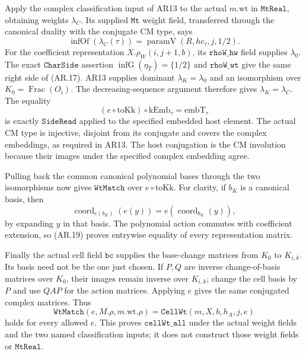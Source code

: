 Apply the complex classification input of AR13 to the actual
$m.\mathrm{wt}$ in $\texttt{MtReal}$, obtaining weights
$\lambda_C$. Its supplied $\texttt{Mt}$ weight field, transferred
through the canonical duality with the conjugate CM type, says
\[
 \operatorname{infOf}(\lambda_C(\tau))
           =\operatorname{paramV}(R,hc_\tau,j,1/2).
                                                               \tag{AR.17}
\]
For the coefficient representation $X.\rho_W(i,j+1,b)$, its
$\texttt{rhoW\_hw}$ field supplies $\lambda_0$.
The exact $\texttt{CharSide}$ assertion
$\operatorname{infG}(\eta_T)=\{1/2\}$ and
$\texttt{rhoW\_wt}$ give the same right side of (AR.17).
AR13 supplies dominant $\lambda_K=\lambda_0$ and an isomorphism
over $K_0=\operatorname{Frac}(O_i)$. The decreasing-sequence argument
therefore gives $\lambda_K=\lambda_C$.
The equality
\[
 (e\circ\mathrm{toKk})\circ\mathrm{kEmb}_\tau
                      =\mathrm{embT}_\tau
                                                               \tag{AR.18}
\]
is exactly $\texttt{SideRead}$ applied to the specified embedded
host element. The actual CM type is injective, disjoint from its
conjugate and covers the complex embeddings, as required in AR13.
The host conjugation is the CM involution because their images
under the specified complex embedding agree.

Pulling back the common canonical polynomial bases through the two
isomorphisms now gives $\texttt{WtMatch}$ over $e\circ\mathrm{toKk}$.
For clarity, if $b_K$ is a canonical basis, then
\[
 \operatorname{coord}_{e(b_K)}(e(y))
                         =e(\operatorname{coord}_{b_K}(y)),
                                                               \tag{AR.19}
\]
by expanding $y$ in that basis. The polynomial action commutes with
coefficient extension, so (AR.19) proves entrywise equality of
every representation matrix.

Finally the actual cell field $\texttt{bc}$ supplies the base-change
matrices from $K_0$ to $K_{i,k}$. Its basis need not be the one just
chosen. If $P,Q$ are inverse change-of-basis matrices over $K_0$,
their images remain inverse over $K_{i,k}$; change the cell basis
by $P$ and use $QAP$ for the action matrices. Applying $e$ gives
the same conjugated complex matrices. Thus
\[
 \texttt{WtMatch}(e,M.\rho,m.\mathrm{wt}.\rho)
                      =\texttt{CellWt}(m,X,b,h_A,j,e)            \tag{AR.20}
\]
holds for every allowed $e$. This proves $\texttt{cellWt\_all}$
under the actual weight fields and the two named classification
inputs; it does not construct those weight fields or $\texttt{MtReal}$.

